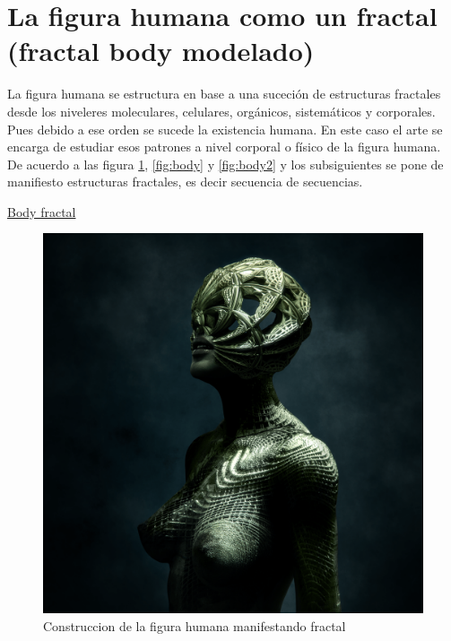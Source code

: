 \documentclass[
  11pt,
]{krantz}
\theoremstyle{definition}
\theoremstyle{definition}
\theoremstyle{definition}
\theoremstyle{definition}
\theoremstyle{remark}
\begin{document}
\hypertarget{la-figura-humana-como-un-fractal-fractal-body-modelado}{%
\section{La figura humana como un fractal (fractal body modelado)}\label{la-figura-humana-como-un-fractal-fractal-body-modelado}}

La figura humana se estructura en base a una suceción de estructuras fractales desde los niveleres moleculares, celulares, orgánicos, sistemáticos y corporales. Pues debido a ese orden se sucede la existencia humana. En este caso el arte se encarga de estudiar esos patrones a nivel corporal o físico de la figura humana. De acuerdo a las figura \ref{fig:body1}, \ref{fig:body} y \ref{fig:body2} y los subsiguientes se pone de manifiesto estructuras fractales, es decir secuencia de secuencias.

\href{https://www.behance.net/gallery/11339339/FRACTAL-BODY}{Body fractal}

\begin{figure}[!ht]

{\centering \includegraphics[width=0.7\linewidth]{body1} 

}

\caption{Construccion de la figura humana manifestando fractal}\label{fig:body1}
\end{figure}
\end{document}
